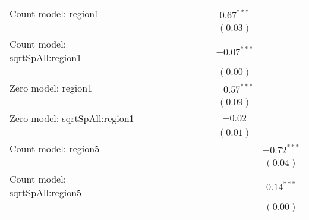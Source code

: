 \begin{center}
\begin{longtable}{l c c c c c c c c c}
Count model: region1           &                &                &               &               &               &                 &               & $0.67^{***}$  &                 \\
                               &                &                &               &               &               &                 &               & $(0.03)$      &                 \\
Count model: sqrtSpAll:region1 &                &                &               &               &               &                 &               & $-0.07^{***}$ &                 \\
                               &                &                &               &               &               &                 &               & $(0.00)$      &                 \\
Zero model: region1            &                &                &               &               &               &                 &               & $-0.57^{***}$ &                 \\
                               &                &                &               &               &               &                 &               & $(0.09)$      &                 \\
Zero model: sqrtSpAll:region1  &                &                &               &               &               &                 &               & $-0.02$       &                 \\
                               &                &                &               &               &               &                 &               & $(0.01)$      &                 \\
Count model: region5           &                &                &               &               &               &                 &               &               & $-0.72^{***}$   \\
                               &                &                &               &               &               &                 &               &               & $(0.04)$        \\
Count model: sqrtSpAll:region5 &                &                &               &               &               &                 &               &               & $0.14^{***}$    \\
                               &                &                &               &               &               &                 &               &               & $(0.00)$        \\

\end{longtable}
\end{center}
